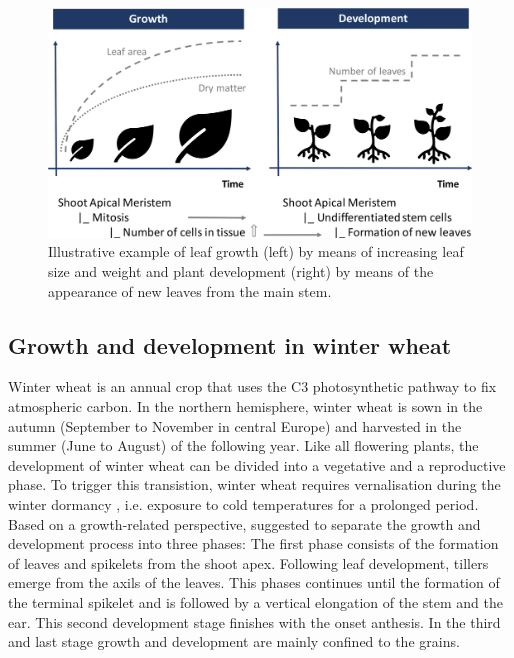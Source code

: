 \begin{figure}[H]
    \centering
    \includegraphics[width=\textwidth]{01-Introduction/img/growth_and_development.pdf}
    \caption{Illustrative example of leaf growth (left) by means of increasing leaf size and weight and plant development (right) by means of the appearance of new leaves from the main stem.}
    \label{fig:growth-development-biology}
\end{figure}

\subsection{Growth and development in winter wheat}

Winter wheat is an annual crop that uses the C3 photosynthetic pathway to fix atmospheric carbon. In the northern hemisphere, winter wheat is sown in the autumn (September to November in central Europe) and harvested in the summer (June to August) of the following year. Like all flowering plants, the development of winter wheat can be divided into a vegetative and a reproductive phase. To trigger this transistion, winter wheat requires vernalisation during the winter dormancy \citep{fedorov_photoperiodism_1976}, i.e. exposure to cold temperatures for a prolonged period.
Based on a growth-related perspective, \cite{kirby_analysis_1988} suggested to separate the growth and development process into three phases: The first phase consists of the formation of leaves and spikelets from the shoot apex. Following leaf development, tillers emerge from the axils of the leaves. This phases continues until the formation of the terminal spikelet and is followed by a vertical elongation of the stem and the ear. This second development stage finishes with the onset anthesis. In the third and last stage growth and development are mainly confined to the grains.

